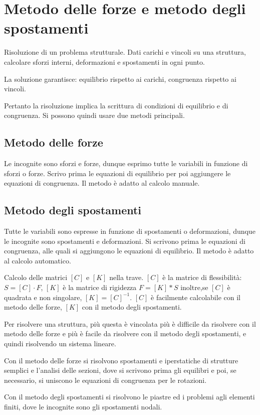 \section{Metodo delle forze e metodo degli spostamenti}

\begin{definizioneBox}
Risoluzione di un problema strutturale. Dati carichi e  vincoli su una struttura, calcolare sforzi interni, deformazioni e spostamenti in ogni punto.
\end{definizioneBox}

La soluzione garantisce: equilibrio rispetto ai carichi, congruenza rispetto ai vincoli.


Pertanto la risoluzione implica la scrittura di condizioni di equilibrio e di congruenza. Si possono quindi usare due metodi principali.

\subsection*{Metodo delle forze}
Le incognite sono sforzi e forze, dunque esprimo tutte le variabili in funzione di sforzi o forze.
Scrivo prima le equazioni di equilibrio per poi aggiungere le equazioni di congruenza. Il metodo è adatto al calcolo manuale.

\subsection*{Metodo degli spostamenti}
Tutte le variabili sono espresse in funzione di spostamenti o deformazioni, dunque le incognite sono spostamenti e deformazioni.
Si scrivono prima le equazioni di congruenza, alle quali si aggiungono le equazioni di equilibrio. Il metodo è adatto al calcolo automatico.

\begin{esempioBox}
Calcolo delle matrici $[C]$ e $[K]$ nella trave. $[C]$ è la matrice di flessibilità: $S = [C] \cdot F$, $[K]$ è la matrice di rigidezza $F = [K]*S$ inoltre,se $[C]$ è quadrata e non singolare, $[K] = [C]^{-1}$.
$[C]$ è facilmente calcolabile con il metodo delle forze, $[K]$ con il metodo degli spostamenti.

Per risolvere una struttura, più questa è vincolata più è difficile da risolvere con il metodo delle forze e più è facile da risolvere con il metodo degli spostamenti, e quindi risolvendo un sistema lineare.

Con il metodo delle forze si risolvono spostamenti e iperstatiche di strutture semplici e l'analisi delle sezioni, dove si scrivono prima gli equilibri e poi, se necessario, si uniscono le equazioni di congruenza per le rotazioni.

Con il metodo degli spostamenti si risolvono le piastre ed i problemi agli elementi finiti, dove le incognite sono gli spostamenti nodali.
\end{esempioBox}

